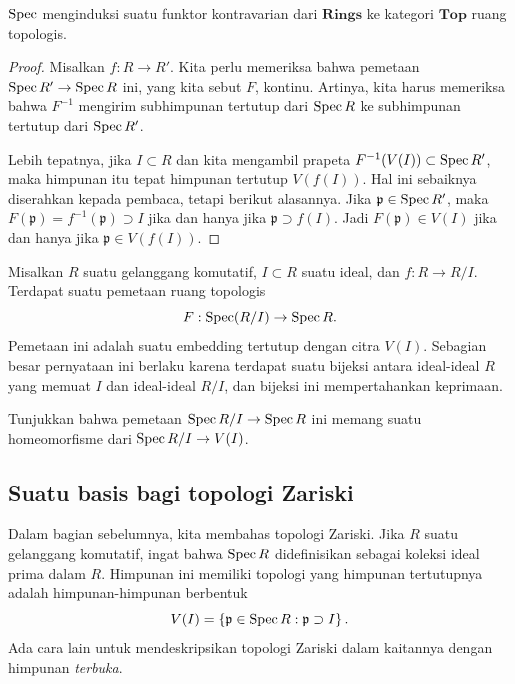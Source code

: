 \begin{proposition} 
$\operatorname{Spec} $ menginduksi suatu funktor kontravarian dari $\mathbf{Rings}$
ke kategori
$\mathbf{Top}$ ruang topologis.
\end{proposition} 
\begin{proof} Misalkan $f : R \to R'$. 
Kita perlu memeriksa bahwa pemetaan $ \operatorname{Spec} R' \to \operatorname{Spec} R$ ini, yang
kita sebut $F$,
kontinu.
Artinya, kita harus memeriksa bahwa $F^{-1}$ mengirim subhimpunan tertutup
dari $\operatorname{Spec} R$ ke subhimpunan tertutup dari $\operatorname{Spec} R'$.  

Lebih tepatnya, jika $I \subset
R$ dan kita mengambil prapeta $F^{-1}(V(I)) \subset \operatorname{Spec}
R'$, maka himpunan itu tepat
himpunan tertutup $V(f(I))$. Hal ini sebaiknya diserahkan kepada pembaca, tetapi
berikut alasannya. Jika $\mathfrak{p} \in \operatorname{Spec} R'$, maka
$F(\mathfrak{p}) = f^{-1}(\mathfrak{p})
\supset I$ jika dan hanya jika $\mathfrak{p} \supset f(I)$. Jadi
$F(\mathfrak{p}) \in
V(I)$ jika dan hanya jika $\mathfrak{p} \in V(f(I))$.

\end{proof} 



\begin{example} 
Misalkan $R$ suatu gelanggang komutatif, $I \subset R$ suatu ideal, dan $f: R \to
R/I$. Terdapat suatu pemetaan
ruang topologis
\[ F: \operatorname{Spec} (R/I) \to \operatorname{Spec} R  .\]
Pemetaan ini adalah suatu embedding tertutup dengan citra $V(I)$. Sebagian besar
pernyataan ini berlaku karena
terdapat suatu bijeksi antara ideal-ideal $R$ yang memuat $I$ dan
ideal-ideal $R/I$, dan bijeksi ini mempertahankan keprimaan.

\begin{exercise} 
Tunjukkan bahwa pemetaan $\operatorname{Spec} R/I \to \operatorname{Spec} R$ ini memang suatu
homeomorfisme dari $\operatorname{Spec} R/I
\to V(I)$.  
\end{exercise} 
\end{example} 


\subsection{Suatu basis bagi topologi Zariski}
Dalam bagian sebelumnya, kita membahas topologi Zariski.
Jika $R$ suatu
gelanggang komutatif, ingat bahwa $\operatorname{Spec} R$ didefinisikan sebagai
koleksi
ideal prima dalam $R$. Himpunan ini memiliki topologi yang himpunan tertutupnya
adalah himpunan-himpunan
berbentuk
\[ V(I) = \left\{\mathfrak{p} \in \operatorname{Spec} R: \mathfrak{p} \supset
I\right\} . \]
Ada cara lain untuk mendeskripsikan topologi Zariski dalam kaitannya dengan
himpunan
\emph{terbuka}.  

